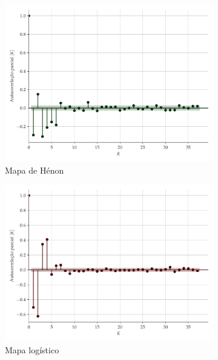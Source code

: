 \documentclass[a4paper, 12pt]{article}
\begin{document}
\begin{figure}[H]
     \begin{subfigure}[t]{0.325\textwidth}
         \includegraphics[scale=0.30]{autocorrelacao-parcial-henon.pdf}
         \caption{Mapa de Hénon}
     \end{subfigure}
     \centering
     \begin{subfigure}[t]{0.325\textwidth} 
         \includegraphics[scale=0.30]{autocorrelacao-parcial-logistic.pdf}
         \caption{Mapa logístico}
     \end{subfigure}
     \centering
     \\
     \begin{subfigure}[t]{0.325\textwidth}

\end{subfigure}
\end{figure}
\end{document}
